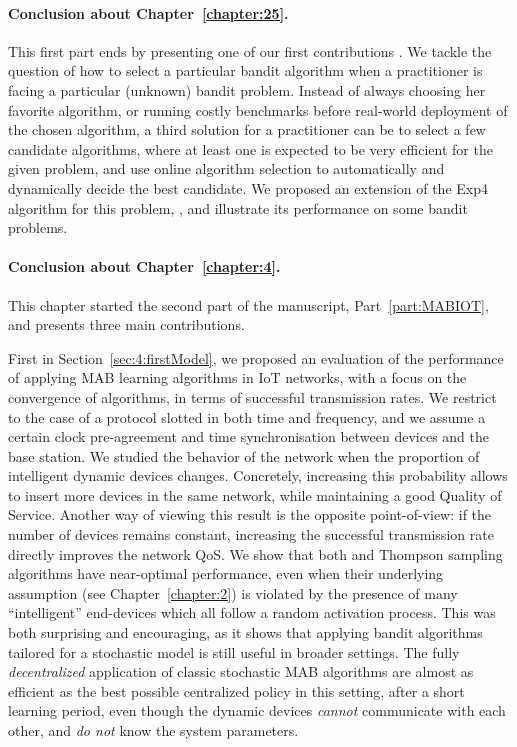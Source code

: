 \paragraph{Conclusion about \textbf{Chapter~\ref{chapter:25}}.}
%
This first part ends by presenting one of our first contributions \cite{Besson2018WCNC}.
We tackle the question of how to select a particular bandit algorithm when a practitioner is facing a particular (unknown) bandit problem.
Instead of always choosing her favorite algorithm, or running costly benchmarks before real-world deployment of the chosen algorithm, a third solution for a practitioner can be to select a few candidate algorithms, where at least one is expected to be very efficient for the given problem, and use online algorithm selection to automatically and dynamically decide the best candidate.
We proposed an extension of the Exp4 algorithm for this problem, \Aggr, and illustrate its performance on some bandit problems.


\paragraph{Conclusion about \textbf{Chapter~\ref{chapter:4}}.}

This chapter started the second part of the manuscript, Part~\ref{part:MABIOT}, and presents three main contributions.

First in Section~\ref{sec:4:firstModel}, we proposed an evaluation of the performance of applying MAB learning algorithms in IoT networks,
with a focus on the convergence of algorithms, in terms of successful transmission rates.
We restrict to the case of a protocol slotted in both time and frequency, and we assume a certain clock pre-agreement and time synchronisation between devices and the base station.
We studied the behavior of the network when the proportion of intelligent dynamic devices changes.
Concretely, increasing this probability allows to insert more devices in the same network, while maintaining a good Quality of Service.
Another way of viewing this result is the opposite point-of-view: if the number of devices remains constant, increasing the successful transmission rate directly improves the network QoS.
We show that both \UCB{} and Thompson sampling algorithms have near-optimal performance, even when their underlying \iid{} assumption (see Chapter~\ref{chapter:2}) is violated by the presence of many ``intelligent'' end-devices which all follow a random activation process.
%
This was both surprising and encouraging, as it shows that applying bandit algorithms tailored for a stochastic model is still useful in broader settings.
The fully \emph{decentralized} application of classic stochastic MAB algorithms are almost as efficient as the best possible centralized policy in this setting, after a short learning period, even though the dynamic devices \emph{cannot} communicate with each other, and \emph{do not} know the system parameters.


